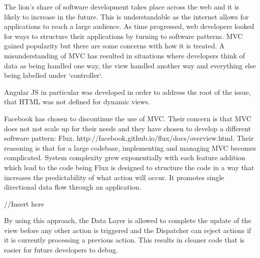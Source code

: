 The lion's share of software development takes place across the web and it is likely to increase in the future. This is understandable
as the internet allows for applications to reach a large audience. As time progressed, web developers looked for ways to structure their
applications by turning to software patterns. MVC gained popularity but there are some concerns with how it is treated. A misunderstanding of
MVC has resulted in situations where developers think of data as being handled one way, the view handled another way and everything else being labelled
under `controller`.\par


Angular JS in particular was developed in order to address the root of the issue, that HTML was not defined for dynamic views.\par
{}\par

Facebook has chosen to discontinue the use of MVC. Their concern is that MVC does not not scale up for their needs and they have chosen to
develop a different software pattern: Flux. http://facebook.github.io/flux/docs/overview.html. Their reasoning is that for a large codebase, implementing
and managing MVC becomes complicated. System complexity grew exponentially with each feature addition which lead to the code being 
Flux is designed to structure the code in a way that increases the predictability of what action will occur. It promotes single directional data flow
through an application. \par

//Insert here

\par

By using this approach, the Data Layer is allowed to complete the update of the view before any other action is triggered and the Dispatcher can
reject actions if it is currently processing a previous action. This results in cleaner code that is easier for future developers to debug.
